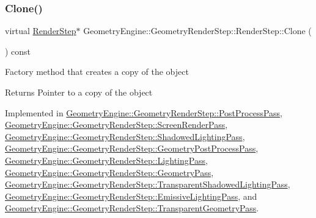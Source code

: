 \subsubsection{\texorpdfstring{Clone()}{Clone()}}
{\footnotesize\ttfamily virtual \mbox{\hyperlink{class_geometry_engine_1_1_geometry_render_step_1_1_render_step}{Render\+Step}}$\ast$ Geometry\+Engine\+::\+Geometry\+Render\+Step\+::\+Render\+Step\+::\+Clone (\begin{DoxyParamCaption}{ }\end{DoxyParamCaption}) const\hspace{0.3cm}{\ttfamily [pure virtual]}}

Factory method that creates a copy of the object \begin{DoxyReturn}{Returns}
Pointer to a copy of the object 
\end{DoxyReturn}


Implemented in \mbox{\hyperlink{class_geometry_engine_1_1_geometry_render_step_1_1_post_process_pass_afcf20dc0a20cf1e0fb730c7b56071c26}{Geometry\+Engine\+::\+Geometry\+Render\+Step\+::\+Post\+Process\+Pass}}, \mbox{\hyperlink{class_geometry_engine_1_1_geometry_render_step_1_1_screen_render_pass_a125bea5e92ff920b57012f9b0b177a1e}{Geometry\+Engine\+::\+Geometry\+Render\+Step\+::\+Screen\+Render\+Pass}}, \mbox{\hyperlink{class_geometry_engine_1_1_geometry_render_step_1_1_shadowed_lighting_pass_a73176d6860aee0903034eeaf93edb40d}{Geometry\+Engine\+::\+Geometry\+Render\+Step\+::\+Shadowed\+Lighting\+Pass}}, \mbox{\hyperlink{class_geometry_engine_1_1_geometry_render_step_1_1_geometry_post_process_pass_ab9eab79bba7251936921032596be21fe}{Geometry\+Engine\+::\+Geometry\+Render\+Step\+::\+Geometry\+Post\+Process\+Pass}}, \mbox{\hyperlink{class_geometry_engine_1_1_geometry_render_step_1_1_lighting_pass_a4f1cb36c7bf6a90d0aa3b8e8feba5e5e}{Geometry\+Engine\+::\+Geometry\+Render\+Step\+::\+Lighting\+Pass}}, \mbox{\hyperlink{class_geometry_engine_1_1_geometry_render_step_1_1_geometry_pass_a12e85a0169cb7b92cb8bd7b7fe100b33}{Geometry\+Engine\+::\+Geometry\+Render\+Step\+::\+Geometry\+Pass}}, \mbox{\hyperlink{class_geometry_engine_1_1_geometry_render_step_1_1_transparent_shadowed_lighting_pass_a56d2ef131669ae3964a04cb54e6c3b0f}{Geometry\+Engine\+::\+Geometry\+Render\+Step\+::\+Transparent\+Shadowed\+Lighting\+Pass}}, \mbox{\hyperlink{class_geometry_engine_1_1_geometry_render_step_1_1_emissive_lighting_pass_a5a46d5e73fe672e09584a2e6e8bfa5e8}{Geometry\+Engine\+::\+Geometry\+Render\+Step\+::\+Emissive\+Lighting\+Pass}}, and \mbox{\hyperlink{class_geometry_engine_1_1_geometry_render_step_1_1_transparent_geometry_pass_a6bfc83f45b84112bbf1beda1ed8e5466}{Geometry\+Engine\+::\+Geometry\+Render\+Step\+::\+Transparent\+Geometry\+Pass}}.

